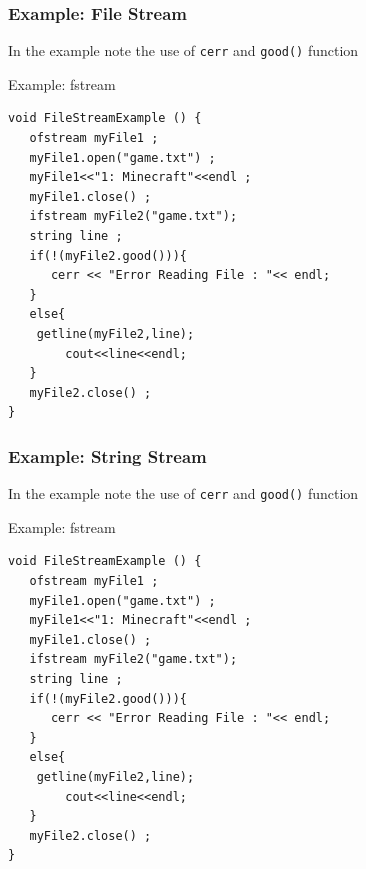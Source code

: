 \documentclass{beamer}
\begin{document}
\begin{frame}[fragile]
\frametitle{Example: File Stream}
In the example note the use of \texttt{cerr} and \texttt{good()} function
\begin{block}{Example: fstream}
\begin{scriptsize}

\begin{verbatim}
void FileStreamExample () {
   ofstream myFile1 ;
   myFile1.open("game.txt") ;
   myFile1<<"1: Minecraft"<<endl ;
   myFile1.close() ;
   ifstream myFile2("game.txt");
   string line ;
   if(!(myFile2.good())){
      cerr << "Error Reading File : "<< endl;	
   }
   else{
	getline(myFile2,line);
        cout<<line<<endl;
   }
   myFile2.close() ;
}
\end{verbatim}

\end{scriptsize}

\end{block}

\end{frame}

\begin{frame}[fragile]
\frametitle{Example: String Stream}
In the example note the use of \texttt{cerr} and \texttt{good()} function
\begin{block}{Example: fstream}
\begin{scriptsize}

\begin{verbatim}
void FileStreamExample () {
   ofstream myFile1 ;
   myFile1.open("game.txt") ;
   myFile1<<"1: Minecraft"<<endl ;
   myFile1.close() ;
   ifstream myFile2("game.txt");
   string line ;
   if(!(myFile2.good())){
      cerr << "Error Reading File : "<< endl;	
   }
   else{
	getline(myFile2,line);
        cout<<line<<endl;
   }
   myFile2.close() ;
}
\end{verbatim}

\end{scriptsize}

\end{block}

\end{frame}
\end{document}
